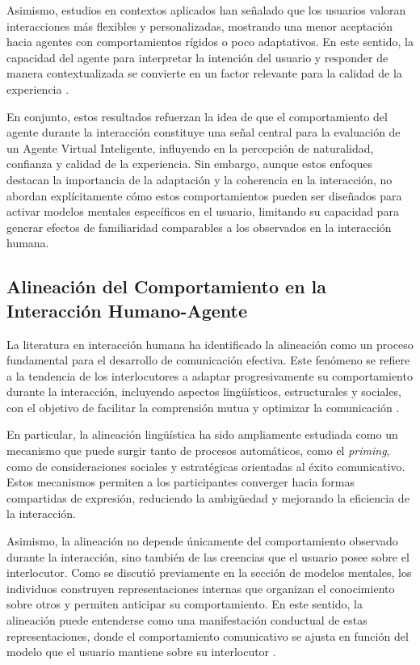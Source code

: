 \documentclass[12pt]{article}
\begin{document}
Asimismo, estudios en contextos aplicados han señalado que los usuarios valoran interacciones más flexibles y personalizadas, mostrando una menor aceptación hacia agentes con comportamientos rígidos o poco adaptativos. En este sentido, la capacidad del agente para interpretar la intención del usuario y responder de manera contextualizada se convierte en un factor relevante para la calidad de la experiencia \cite{davis_process_2020}.

En conjunto, estos resultados refuerzan la idea de que el comportamiento del agente durante la interacción constituye una señal central para la evaluación de un Agente Virtual Inteligente, influyendo en la percepción de naturalidad, confianza y calidad de la experiencia. Sin embargo, aunque estos enfoques destacan la importancia de la adaptación y la coherencia en la interacción, no abordan explícitamente cómo estos comportamientos pueden ser diseñados para activar modelos mentales específicos en el usuario, limitando su capacidad para generar efectos de familiaridad comparables a los observados en la interacción humana.



\subsection{Alineación del Comportamiento en la Interacción Humano-Agente}

La literatura en interacción humana ha identificado la alineación como un proceso fundamental para el desarrollo de comunicación efectiva. Este fenómeno se refiere a la tendencia de los interlocutores a adaptar progresivamente su comportamiento durante la interacción, incluyendo aspectos lingüísticos, estructurales y sociales, con el objetivo de facilitar la comprensión mutua y optimizar la comunicación \cite{branigan_linguistic_2010}.

En particular, la alineación lingüística ha sido ampliamente estudiada como un mecanismo que puede surgir tanto de procesos automáticos, como el \textit{priming}, como de consideraciones sociales y estratégicas orientadas al éxito comunicativo. Estos mecanismos permiten a los participantes converger hacia formas compartidas de expresión, reduciendo la ambigüedad y mejorando la eficiencia de la interacción.

Asimismo, la alineación no depende únicamente del comportamiento observado durante la interacción, sino también de las creencias que el usuario posee sobre el interlocutor. Como se discutió previamente en la sección de modelos mentales, los individuos construyen representaciones internas que organizan el conocimiento sobre otros y permiten anticipar su comportamiento. En este sentido, la alineación puede entenderse como una manifestación conductual de estas representaciones, donde el comportamiento comunicativo se ajusta en función del modelo que el usuario mantiene sobre su interlocutor \cite{branigan_linguistic_2010}.
\end{document}
